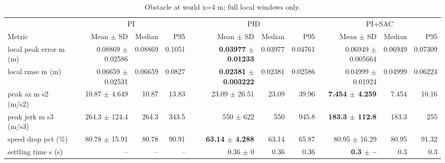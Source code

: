 \begin{table}[t]
\centering
\scriptsize
\caption{Obstacle at world x=4 m; full local windows only.}
\label{tab:obstacle-7}
\begin{tabular}{p{}*{9}{r}}
\toprule
 & \multicolumn{3}{c}{PI} & \multicolumn{3}{c}{PID} & \multicolumn{3}{c}{PI+SAC} \\
\cmidrule(lr){2-4}\cmidrule(lr){5-7}\cmidrule(lr){8-10}
Metric & Mean $\pm$ SD & Median & P95 & Mean $\pm$ SD & Median & P95 & Mean $\pm$ SD & Median & P95 \\
\midrule
local peak error m (m) & 0.08869 $\pm$ 0.02586 & 0.08869 & 0.1051 & \textbf{0.03977 $\pm$ 0.01233} & 0.03977 & 0.04761 & 0.06949 $\pm$ 0.005664 & 0.06949 & 0.07309 \\
local rmse m (m) & 0.06659 $\pm$ 0.02531 & 0.06659 & 0.0827 & \textbf{0.02381 $\pm$ 0.003222} & 0.02381 & 0.02586 & 0.04999 $\pm$ 0.01924 & 0.04999 & 0.06224 \\
peak az m s2 (m/s2) & 10.87 $\pm$ 4.649 & 10.87 & 13.83 & 23.09 $\pm$ 26.51 & 23.09 & 39.96 & \textbf{7.454 $\pm$ 4.259} & 7.454 & 10.16 \\
peak jerk m s3 (m/s3) & 264.3 $\pm$ 124.4 & 264.3 & 343.5 & 550 $\pm$ 622 & 550 & 945.8 & \textbf{183.3 $\pm$ 112.8} & 183.3 & 255 \\
speed drop pct (\%) & 80.78 $\pm$ 15.91 & 80.78 & 90.91 & \textbf{63.14 $\pm$ 4.288} & 63.14 & 65.87 & 80.95 $\pm$ 16.29 & 80.95 & 91.32 \\
settling time s (s) & -- & -- & -- & 0.36 $\pm$ 0 & 0.36 & 0.36 & \textbf{0.3 $\pm$ --} & 0.3 & 0.3 \\
\bottomrule
\end{tabular}
\end{table}
